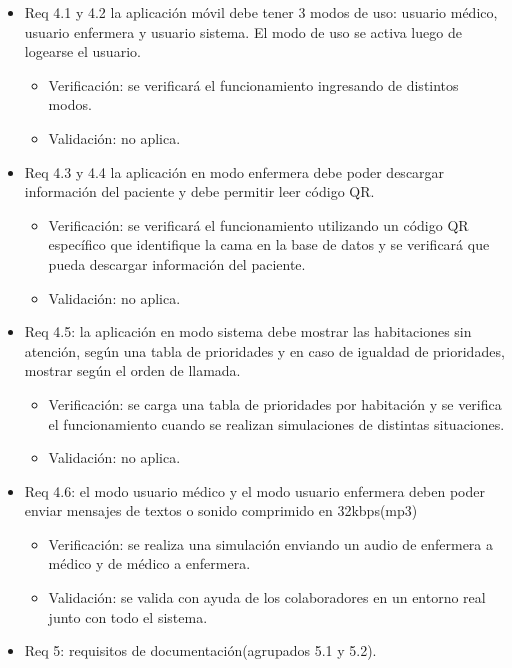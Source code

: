 \documentclass[
11pt, %
]{charter}
\begin{document}
\begin{itemize}
\item Req 4.1 y 4.2 la aplicación móvil debe tener 3 modos de uso: usuario médico, usuario enfermera y usuario sistema. El modo de uso se activa luego de logearse el usuario.
	\begin{itemize}
	\item Verificación: se verificará el funcionamiento ingresando de distintos modos.
	\item Validación: no aplica.
	\end{itemize}		
	
\item Req 4.3 y 4.4 la aplicación en modo enfermera debe poder descargar información del paciente y debe permitir leer código QR.
	\begin{itemize}
	\item Verificación: se verificará el funcionamiento utilizando un código QR específico que identifique la cama en la base de datos y se verificará que pueda descargar información del paciente.
	\item Validación: no aplica.
	\end{itemize}		


\item Req 4.5: la aplicación en modo sistema debe mostrar las habitaciones sin atención, según una tabla de prioridades y en caso de igualdad de prioridades, mostrar según el orden de llamada.
	\begin{itemize}
	\item Verificación: se carga una tabla de prioridades por habitación y se verifica el funcionamiento cuando se realizan simulaciones de distintas situaciones.
	\item Validación:  no aplica.
	\end{itemize}	

\item Req 4.6: el modo usuario médico y el modo usuario enfermera deben poder enviar mensajes de textos o sonido comprimido en 32kbps(mp3)
	\begin{itemize}
	\item Verificación: se realiza una simulación enviando un audio de enfermera a médico y de médico a enfermera.
	\item Validación:  se valida con ayuda de los colaboradores en un entorno real junto con todo el sistema.
	\end{itemize}		

\item Req 5: requisitos de documentación(agrupados 5.1 y 5.2).


\end{itemize}
\end{document}
